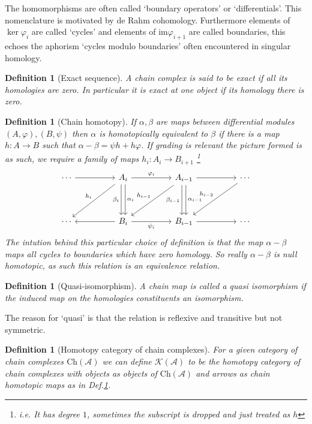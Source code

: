 \documentclass[12pt]{article}
\numberwithin{equation}{section}
\newcounter{dummy} \numberwithin{dummy}{section}
\newtheorem{definition}[dummy]{Definition}
\begin{document}
	
	The homomorphisms are often called {`boundary operators'} or {`differentials'}. This nomenclature is motivated by de Rahm cohomology. Furthermore elements of $\ker \varphi_i$ are called `{cycles}' and elements of $\mathrm{im} \varphi_{i+1}$ are called {boundaries}, this echoes the aphorism `cycles modulo boundaries' often encountered in singular homology.
	\begin{definition}[Exact sequence]
		A chain complex is said to be {exact} if all its homologies are zero. In particular it is exact at one object if its homology there is zero.
	\end{definition}
	
	\begin{definition}[Chain homotopy]\label{chainhomotopy}
		If $\alpha, \beta $ are maps between differential modules $(A, \varphi), (B, \psi )$ then $\alpha $ is homotopically equivalent to $\beta $ if there is a map $h: A \to B $ such that $\alpha - \beta = \psi h+ h \varphi$. If grading is relevant the picture formed is as such, we require a family of maps $h_i: A_i \to B_{i+1}$ \footnote{i.e. It has degree $1$, sometimes the subscript is dropped and just treated as $h$}
		\[\begin{tikzcd}
			\cdots && {A_i} && {A_{i-1}} && \cdots \\
			\\
			\cdots && {B_i} && {B_{i-1}} && \cdots
			\arrow["{\varphi_i}", from=1-3, to=1-5]
			\arrow["{\psi_i}"', from=3-3, to=3-5]
			\arrow["{h_{i-1}}"', from=1-5, to=3-3]
			\arrow["{\beta_i}"', shift right, from=1-3, to=3-3]
			\arrow[from=3-3, to=3-1]
			\arrow["{h_i}"', from=1-3, to=3-1]
			\arrow["{\alpha_{i-1}}", shift left, from=1-5, to=3-5]
			\arrow[from=1-1, to=1-3]
			\arrow["{h_{i-2}}"', from=1-7, to=3-5]
			\arrow[from=1-5, to=1-7]
			\arrow["{\alpha_i}", shift left, from=1-3, to=3-3]
			\arrow["{\beta_{i-1}}"', shift right, from=1-5, to=3-5]
			\arrow[from=3-5, to=3-7]
		\end{tikzcd}\]
		The intution behind this particular choice of definition is that the map $\alpha - \beta $ maps all cycles to boundaries which have zero homology. So really $\alpha- \beta$ is null homotopic, as such this relation is an equivalence relation.
	\end{definition}
	\begin{definition}[Quasi-isomorphism]
		A chain map is called a quasi isomorphism if the induced map on the homologies constituents an isomorphism.
	\end{definition}
	The reason for `quasi' is that the relation is reflexive and transitive but not symmetric. 
	\begin{definition}[Homotopy category of chain complexes]
		For a given category of chain complexes $\mathrm{Ch}(\mathcal{A})$ we can define $\mathcal{K}(\mathcal{A})$ to be the homotopy category of chain complexes with objects as objects of $\mathrm{Ch}(\mathcal{A})$ and arrows as chain homotopic maps as in Def.\ref{chainhomotopy}.
	\end{definition}
	
\end{document}
